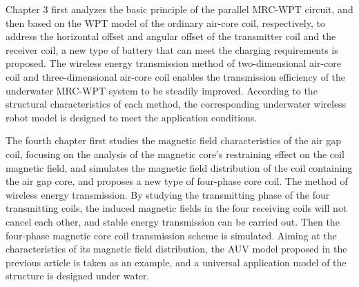 Chapter 3 first analyzes the basic principle of the parallel MRC-WPT circuit, and then based on the WPT model of the ordinary air-core coil, respectively, to address the horizontal offset and angular offset of the transmitter coil and the receiver coil, a new type of battery that can meet the charging requirements is proposed. The wireless energy transmission method of two-dimensional air-core coil and three-dimensional air-core coil enables the transmission efficiency of the underwater MRC-WPT system to be steadily improved. According to the structural characteristics of each method, the corresponding underwater wireless robot model is designed to meet the application conditions.

The fourth chapter first studies the magnetic field characteristics of the air gap coil, focusing on the analysis of the magnetic core's restraining effect on the coil magnetic field, and simulates the magnetic field distribution of the coil containing the air gap core, and proposes a new type of four-phase core coil. The method of wireless energy transmission. By studying the transmitting phase of the four transmitting coils, the induced magnetic fields in the four receiving coils will not cancel each other, and stable energy transmission can be carried out. Then the four-phase magnetic core coil transmission scheme is simulated. Aiming at the characteristics of its magnetic field distribution, the AUV model proposed in the previous article is taken as an example, and a universal application model of the structure is designed under water.